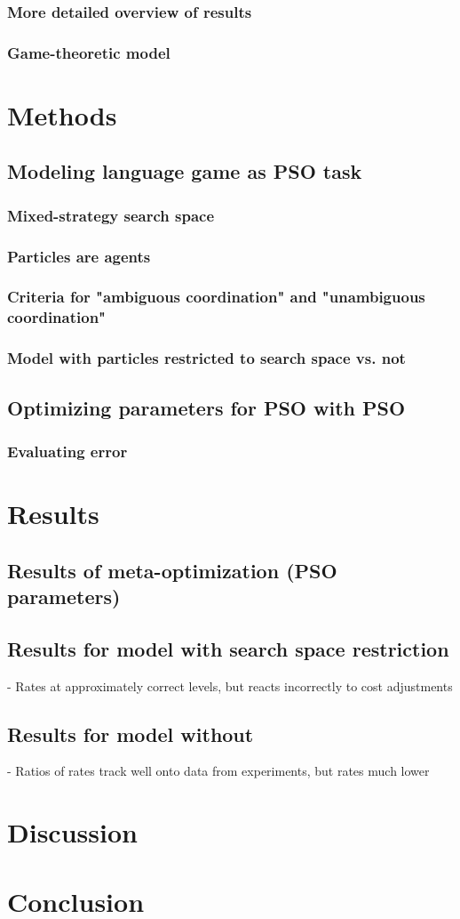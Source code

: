 \documentclass[12pt]{article}
\begin{document}
\subsubsection{More detailed overview of results}
\subsubsection{Game-theoretic model}


\section{Methods}
\subsection{Modeling language game as PSO task}
\subsubsection{Mixed-strategy search space}
\subsubsection{Particles are agents}
\subsubsection{Criteria for "ambiguous coordination" and "unambiguous coordination"}
\subsubsection{Model with particles restricted to search space vs. not}

\subsection{Optimizing parameters for PSO with PSO}
\subsubsection{Evaluating error}

\section{Results}
\subsection{Results of meta-optimization (PSO parameters)}
\subsection{Results for model with search space restriction}
- Rates at approximately correct levels, but reacts incorrectly to cost adjustments
\subsection{Results for model without}
- Ratios of rates track well onto data from experiments, but rates much lower


\section{Discussion}



\section{Conclusion}
\end{document}
